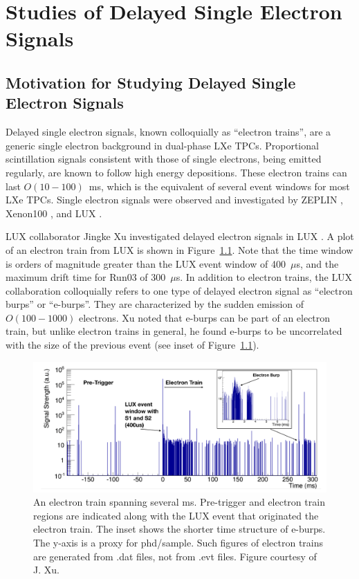 \chapter{Studies of Delayed Single Electron Signals}
\label{ch:etrains} 

\section{Motivation for Studying Delayed Single Electron Signals}
Delayed single electron signals, known colloquially as ``electron trains'', are a generic single electron background in dual-phase \ac{LXe} \ac{TPC}s. Proportional scintillation signals consistent with those of single electrons, being emitted regularly, are known to follow high energy depositions. These electron trains can last $O(10-100)$~ms, which is the equivalent of several event windows for most \ac{LXe} \ac{TPC}s. Single electron signals were observed and investigated by ZEPLIN \cite{Edwards2008} \cite{Santos2011}, Xenon100 \cite{Aprile2014}, and LUX \cite{Xu2016}. 

\ac{LUX} collaborator Jingke Xu investigated delayed electron signals in \ac{LUX} \cite{Xu2016}. A plot of an electron train from \ac{LUX} is shown in Figure~\ref{fig:lux_etrain}. Note that the time window is orders of magnitude greater than the \ac{LUX} event window of 400~$\mu$s, and the maximum drift time for Run03 of 300~$\mu$s. In addition to electron trains, the \ac{LUX} collaboration colloquially refers to one type of delayed electron signal as ``electron burps'' or ``e-burps''. They are characterized by the sudden emission of $O(100-1000)$ electrons. Xu noted that e-burps can be part of an electron train, but unlike electron trains in general, he found e-burps to be uncorrelated with the size of the previous event (see inset of Figure~\ref{fig:lux_etrain}). 

\begin{figure}[htbp]
\begin{center}
\includegraphics[width=\textwidth]{figures/etrains/lux_etrain_eburp.png}
\caption{An electron train spanning several ms. Pre-trigger and electron train regions are indicated along with the \ac{LUX} event that originated the electron train. The inset shows the shorter time structure of e-burps. The y-axis is a proxy for phd/sample. Such figures of electron trains are generated from .dat files, not from .evt files. Figure courtesy of J. Xu. }
\label{fig:lux_etrain}
\end{center}
\end{figure}


